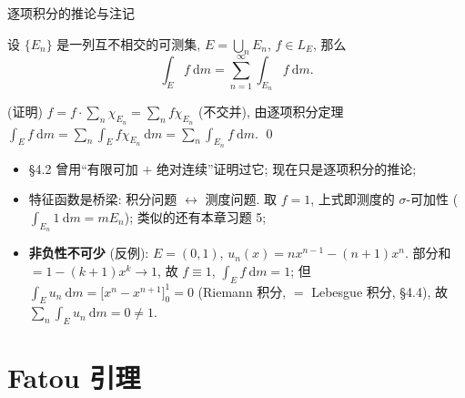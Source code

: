 \begin{frame}{逐项积分的推论与注记}

\begin{cor}
设 $\{E_n\}$ 是一列互不相交的可测集, $E = \bigcup_n E_n$, $f \in L_E$, 那么
\[
\int_E f ~ \mathrm{d} m = \sum_{n=1}^{\infty} \int_{E_n} f ~ \mathrm{d} m .
\]
\end{cor}

\startproof[bg=yellow, fg=red](证明)
$f = f \cdot \sum_n \chi_{E_n} = \sum_n f \chi_{E_n}$ (不交并), 由逐项积分定理
$\int_E f ~ \mathrm{d} m = \sum_n \int_E f \chi_{E_n} ~ \mathrm{d} m = \sum_n \int_{E_n} f ~ \mathrm{d} m$. \qed

\pause

\begin{itemize}
\item \S 4.2 曾用``有限可加 $+$ 绝对连续''证明过它; 现在只是逐项积分的\alert{推论};
\item 特征函数是桥梁: 积分问题 $\leftrightarrow$ 测度问题. 取 $f = 1$, 上式即\alert{测度的 $\sigma$-可加性}
  ($\int_{E_n} 1 ~ \mathrm{d} m = m E_n$); 类似的还有本章习题 5;
\graymode
\item \textbf{非负性不可少} (反例): $E = (0,1)$, $u_n(x) = n x^{n-1} - (n+1) x^n$.
  部分和 $= 1 - (k+1)x^k \to 1$, 故 $f \equiv 1$, $\int_E f ~ \mathrm{d} m = 1$;
  但 $\int_E u_n ~ \mathrm{d} m = \big[ x^n - x^{n+1} \big]_0^1 = 0$
  (Riemann 积分, $=$ Lebesgue 积分, \S 4.4), 故 $\sum_n \int_E u_n ~ \mathrm{d} m = 0 \neq 1$.
\normalmode
\end{itemize}

\end{frame}


\section[Fatou 引理]{Fatou 引理}


